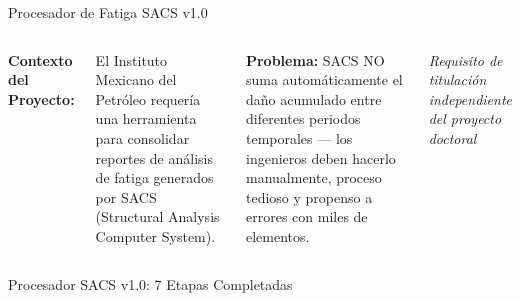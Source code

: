 \documentclass{beamer}
\begin{document}
\begin{frame}{Procesador de Fatiga SACS v1.0}
    \begin{columns}[c]
        \centering
        \small
        \textbf{Contexto del Proyecto:}

        El Instituto Mexicano del Petróleo requería una herramienta para consolidar reportes de análisis de fatiga generados por SACS (Structural Analysis Computer System).

        \vspace{0.3cm}

        \textbf{Problema:} SACS NO suma automáticamente el daño acumulado entre diferentes periodos temporales — los ingenieros deben hacerlo manualmente, proceso tedioso y propenso a errores con miles de elementos.

        \centering
        \small
        \textit{Requisito de titulación independiente del proyecto doctoral}
    \end{columns}
\end{frame}

\begin{frame}{Procesador SACS v1.0: 7 Etapas Completadas}
    \footnotesize
%
%
\end{frame}
\end{document}
